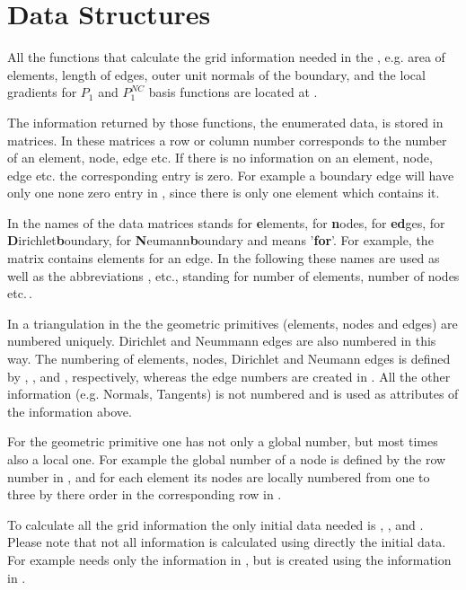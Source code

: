 \section{Data Structures}
\label{sect:DataStructures}

\noindent All the functions that calculate the grid information needed in the \FFW, e.g. area of elements, length of edges, outer unit normals of the boundary, and the local gradients for $P_1$ and $P_1^{NC}$ basis functions are located at .\medskip

\noindent The information returned by those functions, the enumerated data, is stored in matrices. In these matrices a row or column number corresponds to the number of an element, node, edge etc. If there is no information on an element, node, edge etc. the corresponding entry is zero. For example a boundary edge will have only one none zero entry in , since there is only one element which contains it.\medskip

\noindent In the names of the data matrices  stands for \textbf{e}lements,  for \textbf{n}odes,  for \textbf{ed}ges,  for \textbf{D}irichlet\textbf{b}oundary,  for \textbf{N}eumann\textbf{b}oundary and  means '\textbf{for}'. For example, the matrix  contains elements for an edge. In the following these names are used as well as the abbreviations ,
 etc., standing for number of elements, number of nodes etc.\,.\medskip

\noindent In a triangulation in the \FFW the geometric primitives (elements, nodes and edges) are numbered uniquely. Dirichlet and Neummann edges are also numbered in this way. The numbering of elements, nodes, Dirichlet and Neumann edges is defined by , ,  and , respectively, whereas the edge numbers are created in . All the other information (e.g. Normals, Tangents) is not numbered and is used as attributes of the information above.\medskip

\noindent For the geometric primitive one has not only a global number, but most times also a local one. For example the global number of a node is defined by the row number in , and for each element its nodes are locally numbered from one to three by there order in the corresponding row in .\medskip

\noindent To calculate all the grid information the only initial data needed is , ,  and . Please note that not all information is calculated using directly the initial data. For example  needs only the information in , but  is created using the information in .\bigskip\\


